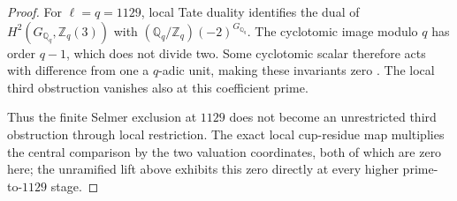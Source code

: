 \begin{proof}
For \(\ell=q=1129\), local Tate duality identifies the
dual of \(H^2(G_{\mathbb Q_q},\mathbb Z_q(3))\)
with \((\mathbb Q_q/\mathbb Z_q)(-2)^{G_{\mathbb Q_q}}\).
The cyclotomic image modulo \(q\) has order \(q-1\),
which does not divide two. Some cyclotomic scalar
therefore acts with difference from one a \(q\)-adic
unit, making these invariants zero
\cite[I.2.3]{GhostMilneADT}. The local third obstruction
vanishes also at this coefficient prime.

Thus the finite Selmer exclusion at \(1129\) does not
become an unrestricted third obstruction through local
restriction. The exact local cup-residue map multiplies
the central comparison by the two valuation coordinates,
both of which are zero here; the unramified lift above
exhibits this zero directly at every higher
prime-to-\(1129\) stage.
\end{proof}
